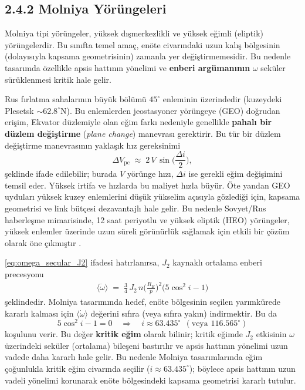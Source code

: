 \subsection*{2.4.2 \hspace{0.25em} Molniya Yörüngeleri}
\label{subsec:molniya}

Molniya tipi yörüngeler, yüksek dışmerkezlikli ve yüksek eğimli (eliptik) yörüngelerdir.
Bu sınıfta temel amaç, enöte civarındaki uzun kalış bölgesinin (dolayısıyla kapsama geometrisinin)
zamanla yer değiştirmemesidir. Bu nedenle tasarımda özellikle apsis hattının yönelimi ve
\textbf{enberi argümanının} $\omega$ seküler sürüklenmesi kritik hale gelir.

\begin{tcolorbox}[
    colback=blue!8!white,
    colframe=blue!35!black,
    boxrule=0.6pt,
    arc=2mm,
    left=4pt,
    right=4pt,
    top=4pt,
    bottom=4pt,
    title=\small\textbf{Tarihsel ve Operasyonel Motivasyon}
]
Rus fırlatma sahalarının büyük bölümü $45^\circ$ enleminin üzerindedir
(kuzeydeki Plesetsk $\sim62.8^\circ$N).
Bu enlemlerden jeostasyoner yörüngeye (GEO) doğrudan erişim,
Ekvator düzlemiyle olan eğim farkı nedeniyle genellikle \textbf{pahalı bir düzlem değiştirme} (\emph{plane change}) manevrası gerektirir. Bu tür bir düzlem değiştirme manevrasının yaklaşık hız gereksinimi
\[
\Delta V_{\text{pc}} \;\approx\; 2\,V\,\sin\!\Big(\frac{\Delta i}{2}\Big),
\]
şeklinde ifade edilebilir; burada $V$ yörünge hızı, $\Delta i$ ise gerekli eğim değişimini temsil eder.
Yüksek irtifa ve hızlarda bu maliyet hızla büyür. Öte yandan GEO uyduları yüksek kuzey enlemlerini düşük yükselim açısıyla gözlediği için, kapsama geometrisi ve link bütçesi dezavantajlı hale gelir. Bu nedenle Sovyet/Rus haberleşme mimarisinde, 12 saat periyotlu ve yüksek eliptik (HEO) yörüngeler, yüksek enlemler üzerinde uzun süreli görünürlük sağlamak için etkili bir çözüm olarak öne çıkmıştır \cite{curtis2020orbital}.
\end{tcolorbox}


\eqref{eq:omega_secular_J2} ifadesi hatırlanırsa, $J_2$ kaynaklı ortalama enberi precesyonu
\begin{align*}
\big\langle \dot\omega \big\rangle
\;=\; \frac{3}{4}\,J_2\,n\Big(\frac{R_E}{p}\Big)^2\big(5\cos^2 i - 1\big)
\end{align*}
şeklindedir. Molniya tasarımında hedef, enöte bölgesinin seçilen yarımkürede kararlı kalması için
$\langle\dot\omega\rangle$ değerini sıfıra (veya sıfıra yakın) indirmektir. Bu da
\begin{equation}
5\cos^2 i-1=0
\quad\Longrightarrow\quad
i \approx 63.435^\circ \ \ (\text{veya }116.565^\circ)
\label{eq:critical_inclination}
\end{equation}
koşulunu verir. Bu değer \textbf{kritik eğim} olarak bilinir; kritik eğimde $J_2$ etkisinin $\omega$ üzerindeki seküler (ortalama) bileşeni bastırılır ve apsis hattının yönelimi uzun vadede daha kararlı hale gelir. Bu nedenle Molniya tasarımlarında eğim çoğunlukla kritik eğim civarında seçilir ($i \approx 63.435^\circ$); böylece apsis hattının uzun vadeli yönelimi korunarak enöte bölgesindeki kapsama geometrisi kararlı tutulur.


